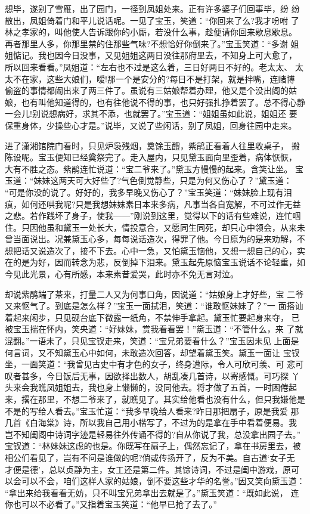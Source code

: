 想毕，遂别了雪雁，出了园门，一径到凤姐处来。正有许多婆子们回事毕，纷
纷散出，凤姐倚着门和平儿说话呢。一见了宝玉，笑道：“你回来了么?我才吩咐
了林之孝家的，叫他使人告诉跟你的小厮，若没什么事，趁便请你回来歇息歇息。
再者那里人多，你那里禁的住那些气味?不想恰好你倒来了。”宝玉笑道：“多谢
姐姐惦记。我也因今日没事，又见姐姐这两日没往那府里去，不知身上可大愈了，
所以回来看看。”凤姐道：“左右也不过是这么着，三日好两日不好的。老太太、
太太不在家，这些大娘们，嗳!那一个是安分的?每日不是打架，就是拌嘴，连赌博
偷盗的事情都闹出来了两三件了。虽说有三姑娘帮着办理，他又是个没出阁的姑
娘，也有叫他知道得的，也有往他说不得的事，也只好强扎挣着罢了。总不得心静
一会儿!别说想病好，求其不添，也就罢了。”宝玉道：“姐姐虽如此说，姐姐还
要保重身体，少操些心才是。”说毕，又说了些闲话，别了凤姐，回身往园中走来。

进了潇湘馆院门看时，只见炉袅残烟，奠馀玉醴，紫鹃正看着人往里收桌子，
搬陈设呢。宝玉便知已经奠祭完了。走入屋内，只见黛玉面向里歪着，病体恹恹，
大有不胜之态。紫鹃连忙说道：“宝二爷来了。”黛玉方慢慢的起来。含笑让坐。
宝玉道：“妹妹这两天可大好些了?气色倒觉静些，只是为何又伤心了？”黛玉道：
“可是你没的说了。好好的，我多早晚又伤心了？”宝玉笑道：“妹妹脸上现有泪
痕，如何还哄我呢?只是我想妹妹素日本来多病，凡事当各自宽解，不可过作无益
之悲。若作践坏了身子，使我——”刚说到这里，觉得以下的话有些难说，连忙咽
住。只因他虽和黛玉一处长大，情投意合，又愿同生同死，却只心中领会，从来未
曾当面说出。况兼黛玉心多，每每说话造次，得罪了他。今日原为的是来劝解，不
想把话又说造次了，接不下去。心中一急，又怕黛玉恼他，又想一想自己的心，实
在的是为好，因而转念为悲，反倒掉下泪来。黛玉起先原恼宝玉说话不论轻重，如
今见此光景，心有所感，本来素昔爱哭，此时亦不免无言对泣。

却说紫鹃端了茶来，打量二人又为何事口角，因说道：“姑娘身上才好些，宝
二爷又来怄气了。到底是怎么样？”宝玉一面拭泪，笑道：“谁敢怄妹妹了？”一
面搭讪着起来闲步，只见砚台底下微露一纸角，不禁伸手拿起。黛玉忙要起身来夺，
已被宝玉揣在怀内，笑央道：“好妹妹，赏我看看罢！”黛玉道：“不管什么，来
了就混翻。”一语未了，只见宝钗走来，笑道：“宝兄弟要看什么？”宝玉因未见
上面是何言词，又不知黛玉心中如何，未敢造次回答，却望着黛玉笑。黛玉一面让
宝钗坐，一面笑道：“我曾见古史中有才色的女子，终身遭际，令人可欣可羡、可
悲可叹者甚多，今日饭后无事，因欲择出数人，胡乱凑几首诗，以寄感慨。可巧探
丫头来会我瞧凤姐姐去，我也身上懒懒的，没同他去。将才做了五首，一时困倦起
来，撂在那里，不想二爷来了，就瞧见了。其实给他看也没有什么，但只我嫌他是
不是的写给人看去。”宝玉忙道：“我多早晚给人看来?昨日那把扇子，原是我爱
那几首《白海棠》诗，所以我自己用小楷写了，不过为的是拿在手中看着便易。我
岂不知闺阁中诗词字迹是轻易往外传诵不得的?自从你说了我，总没拿出园子去。”
宝钗道：“林妹妹这虑的也是。你既写在扇子上，偶然忘记了，拿在书房里去，被
相公们看见了，岂有不问是谁做的呢?倘或传扬开了，反为不美。自古道‘女子无
才便是德’，总以贞静为主，女工还是第二件。其馀诗词，不过是闺中游戏，原可
以会可以不会，咱们这样人家的姑娘，倒不要这些才华的名誉。”因又笑向黛玉道：
“拿出来给我看看无妨，只不叫宝兄弟拿出去就是了。”黛玉笑道：“既如此说，
连你也可以不必看了。”又指着宝玉笑道：“他早已抢了去了。”

